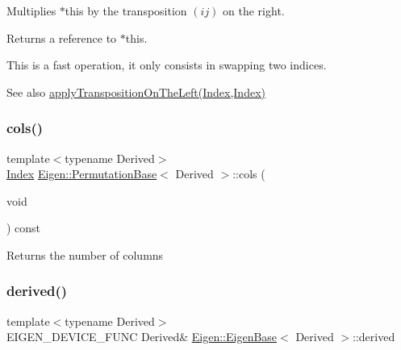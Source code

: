Multiplies $\ast$this by the transposition $(ij)$ on the right.

\begin{DoxyReturn}{Returns}
a reference to $\ast$this.
\end{DoxyReturn}
This is a fast operation, it only consists in swapping two indices.

\begin{DoxySeeAlso}{See also}
\mbox{\hyperlink{class_eigen_1_1_permutation_base_a4e3455bf12b56123e38a8220c6b508dc}{apply\+Transposition\+On\+The\+Left(\+Index,\+Index)}} 
\end{DoxySeeAlso}
\mbox{\label{class_eigen_1_1_permutation_base_a26961ef6cfef586d412054ee5a20d430}} 
\subsubsection{\texorpdfstring{cols()}{cols()}}
{\footnotesize\ttfamily template$<$typename Derived$>$ \\
\mbox{\hyperlink{struct_eigen_1_1_eigen_base_a554f30542cc2316add4b1ea0a492ff02}{Index}} \mbox{\hyperlink{class_eigen_1_1_permutation_base}{Eigen\+::\+Permutation\+Base}}$<$ Derived $>$\+::cols (\begin{DoxyParamCaption}\item[{void}]{ }\end{DoxyParamCaption}) const\hspace{0.3cm}{\ttfamily [inline]}}

\begin{DoxyReturn}{Returns}
the number of columns 
\end{DoxyReturn}
\mbox{\label{class_eigen_1_1_permutation_base_a324b16961a11d2ecfd2d1b7dd7946545}} 
\subsubsection{\texorpdfstring{derived()}{derived()}\hspace{0.1cm}{\footnotesize\ttfamily [1/2]}}
{\footnotesize\ttfamily template$<$typename Derived$>$ \\
E\+I\+G\+E\+N\+\_\+\+D\+E\+V\+I\+C\+E\+\_\+\+F\+U\+NC Derived\& \mbox{\hyperlink{struct_eigen_1_1_eigen_base}{Eigen\+::\+Eigen\+Base}}$<$ Derived $>$\+::derived\hspace{0.3cm}{\ttfamily [inline]}}

